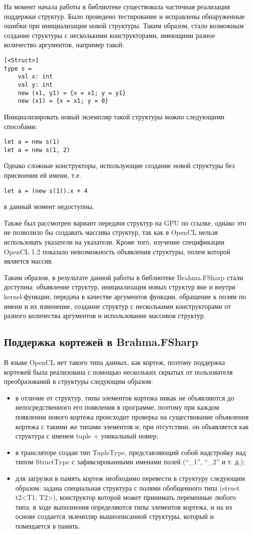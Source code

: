 \documentclass[14pt]{matmex-diploma}
\begin{document}
На момент начала работы в библиотеке существовала частичная реализация поддержки структур. Было проведено тестирование и исправлены обнаруженные ошибки при инициализации новой структуры. Таким образом, стало возможным создание структуры с несколькими конструкторами, имеющими разное количество аргументов, например такой:
\begin{lstlisting}
[<Struct>]
type s =
    val x: int 
    val y: int
    new (x1, y1) = {x = x1; y = y1} 
    new (x1) = {x = x1; y = 0}
\end{lstlisting}
Инициализировать новый экземпляр такой структуры можно следующими способами:
\begin{lstlisting}
let a = new s(1)
let a = new s(1, 2) 
\end{lstlisting}
Однако сложные конструкторы, использующие создание новой структуры без присвоения ей имени, т.е. 
\begin{lstlisting}
let a = (new s(1)).x + 4 
\end{lstlisting}
в данный момент недоступны.

Также был рассмотрен вариант передачи структур на GPU по ссылке, однако это не позволило бы создавать массивы структур, так как в OpenCL нельзя использовать указатели на указатели. Кроме того, изучение спецификации OpenCL 1.2 показало невозможность объявления структуры, полем которой является массив. 

Таким образом, в результате данной работы в библиотеке Brahma.FSharp стали доступны: объявление структур, инициализация новых структур вне и внутри kernel-функции, передача в качестве аргументов функции, обращение к полям по имени и их изменение, создание структур с несколькими конструкторами от разного количества аргументов и использование  массивов структур.
\subsection {Поддержка кортежей в Brahma.FSharp}
В языке OpenCL нет такого типа данных, как кортеж, поэтому поддержка кортежей была реализована с помощью нескольких скрытых от пользователя преобразований в структуры следующим образом:
\begin{itemize}
\item в отличие от структур, типы элементов кортежа никак не объявляются до непосредственного его появления в программе, поэтому при каждом появлении нового кортежа происходит проверка на существование объявления кортежа с такими же типами элементов и, при отсутствии, он объявляется как структура с именем tuple + уникальный номер;
\item в трансляторе создан тип TupleType, представляющий собой надстройку над типом StructType с зафиксированными именами полей (“\_1”, “\_2” и т. д.);
\item для загрузки в память кортеж необходимо перевести в структуру следующим образом: задана специальная структура с полями обобщенного типа (struct t2<T1, T2>), конструктор которой может принимать переменные любого типа; в ходе выполнения определяются типы элементов кортежа, и на их основе создается экземпляр вышеописанной структуры, который и помещается в память.
\end{itemize}
\end{document}
